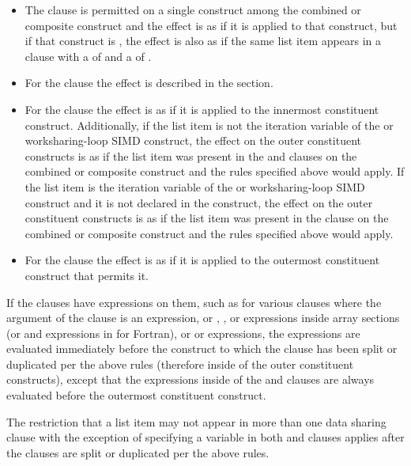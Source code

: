 \begin{itemize}
\item The  clause is permitted on a single construct
among the combined or composite construct and the effect is as if it is
applied to that construct, but if that construct is , the
effect is also as if the same list item appears in a  clause with
a  of  and a  of
.

\item For the  clause the effect is described in the  section.

\item For the  clause the effect is as if it is applied to the innermost
constituent construct.
Additionally, if the list item is not the iteration variable of the
 or worksharing-loop SIMD
construct, the effect on the outer constituent constructs is as if the list item was present
in the  and  clauses on the combined or
composite construct and the rules specified above would apply.  If the list item is the
iteration variable of the  or worksharing-loop SIMD construct and it is not declared in the construct,
the effect on the outer constituent constructs is as if the list item was present in the
 clause on the combined or composite construct and the rules specified above
would apply.

\item For the  clause the effect is as if it is applied to the
outermost constituent construct that permits it.

\end{itemize}

If the clauses have expressions on them, such as for various clauses where the argument of the
clause is an expression, or , , or  expressions inside array
sections (or  and  expressions in  for Fortran),
or  or  expressions, the expressions are evaluated immediately
before the construct to which the clause has been split or duplicated per the
above rules (therefore inside of the outer constituent constructs), except that the expressions inside
of the  and  clauses are always evaluated before the outermost
constituent construct.

The restriction that a list item may not appear in more than one data
sharing clause with the exception of specifying a variable in both
 and  clauses applies after the clauses
are split or duplicated per the above rules.
